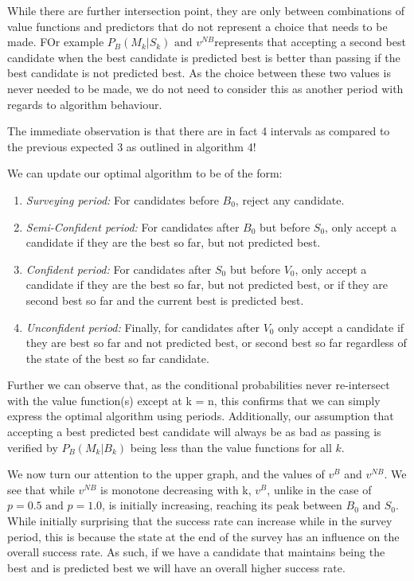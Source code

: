 \documentclass[a4paper,11pt]{article}
\begin{document}
While there are further intersection point, they are only between combinations of value functions and predictors that do not represent a choice that needs to be made. FOr example $ P_B(M_k|S_k) \text{ and }v^{NB}$represents that accepting a second best candidate when the best candidate is predicted best is better than passing if the best candidate is not predicted best. As the choice between these two values is never needed to be made, we do not need to consider this as another period with regards to algorithm behaviour.

The immediate observation is that there are in fact 4 intervals as compared to the previous expected 3 as outlined in algorithm 4!

We can update our optimal algorithm to be of the form:
\begin{enumerate}
    \item \textit{Surveying period:} For candidates before $B_0$, reject any candidate.
    \item \textit{Semi-Confident period:} For candidates after $B_0$ but before $S_0$, only accept a candidate if they are the best so far, but not predicted best.
    \item \textit{Confident period:} For candidates after $S_0$ but before $V_0$, only accept a candidate if they are the best so far, but not predicted best, or if they are second best so far and the current best is predicted best.
    \item \textit{Unconfident period:} Finally, for candidates after $V_0$ only accept a candidate if they are best so far and not predicted best, or second best so far regardless of the state of the best so far candidate.
\end{enumerate}

Further we can observe that, as the conditional probabilities never re-intersect with the value function(s) except at k = n, this confirms that we can simply express the optimal algorithm using periods. Additionally, our assumption that accepting a best predicted best candidate will always be as bad as passing is verified by $P_B(M_k|B_k)$ being less than the value functions for all $k$.

We now turn our attention to the upper graph, and the values of $v^{B}$ and $v^{NB}$. We see that while $v^{NB}$ is monotone decreasing with k, $v^B$, unlike in the case of $p=0.5 \text{ and }  p = 1.0$, is initially increasing, reaching its peak between $B_0 \text{ and } S_0$. While initially surprising that the success rate can increase while in the survey period, this is because the state at the end of the survey has an influence on the overall success rate. As such, if we have a candidate that maintains being the best and is predicted best we will have an overall higher success rate.
\end{document}
